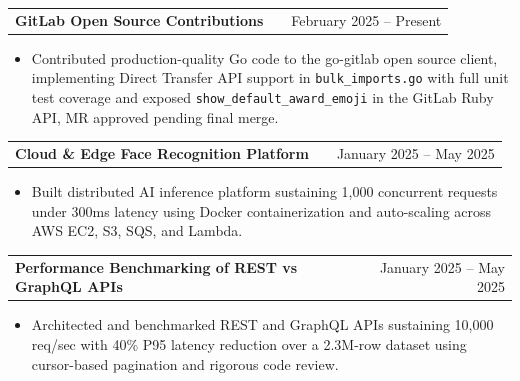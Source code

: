 \documentclass[a4paper,10.5pt]{article} %
\makeatletter
\newenvironment{joblong}[2]{
  \begin{tabularx}{\linewidth}{@{}l X r@{}}
  \textbf{#1} & & #2 \\
  \end{tabularx}
  \vspace{-15pt}
  \begin{itemize}[nosep, leftmargin=1em, itemsep=3pt,label=$\bullet$]
}{\end{itemize}}
\makeatother
\begin{document}
\begin{joblong}{GitLab Open Source Contributions} {February 2025  – Present}
\item Contributed production-quality Go code to the go-gitlab open source 
client, implementing Direct Transfer API support in \texttt{bulk\_imports.go} 
with full unit test coverage and exposed \texttt{show\_default\_award\_emoji} 
in the GitLab Ruby API, MR approved pending final merge.
\end{joblong}

\begin{joblong}{Cloud \& Edge Face Recognition Platform}{January 2025 -- May 2025}
\item Built distributed AI inference platform sustaining 1,000 concurrent requests under 300ms latency using Docker containerization and auto-scaling across AWS EC2, S3, SQS, and Lambda.
\end{joblong}

\begin{joblong}{Performance Benchmarking of REST vs GraphQL APIs}{January 2025 -- May 2025}
\item Architected and benchmarked REST and GraphQL APIs sustaining 10,000 req/sec with 40\% P95 latency reduction over a 2.3M-row dataset using cursor-based pagination and rigorous code review.
\end{joblong}
\end{document}
